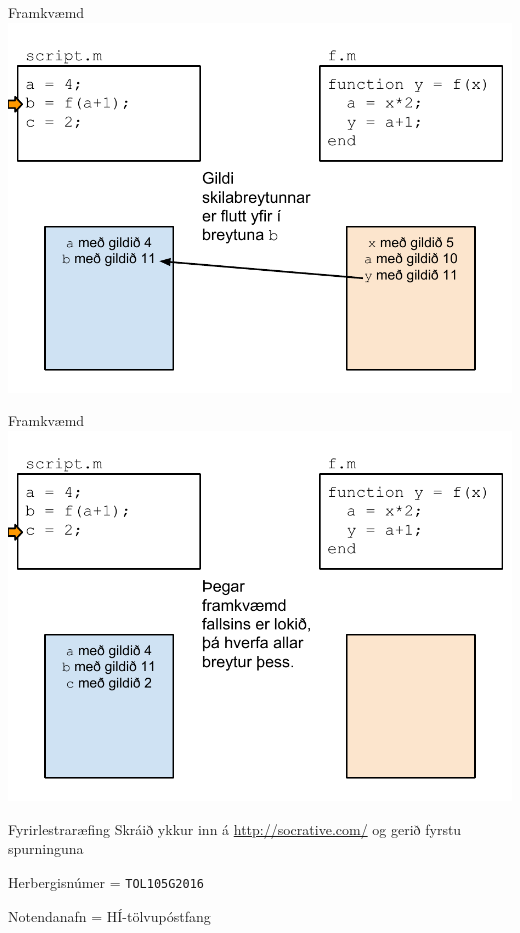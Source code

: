 \documentclass{beamer}
\begin{document}
\begin{frame}{Framkvæmd}
\includegraphics[width=\textwidth]{../Pics/framkvaemd-falls-6}
\end{frame}
\begin{frame}{Framkvæmd}
\includegraphics[width=\textwidth]{../Pics/framkvaemd-falls-7}
\end{frame}

\begin{frame}{Fyrirlestraræfing}
Skráið ykkur inn á \url{http://socrative.com/} og gerið fyrstu spurninguna

Herbergisnúmer = \texttt{TOL105G2016}

Notendanafn = HÍ-tölvupóstfang
\end{frame}
\end{document}
